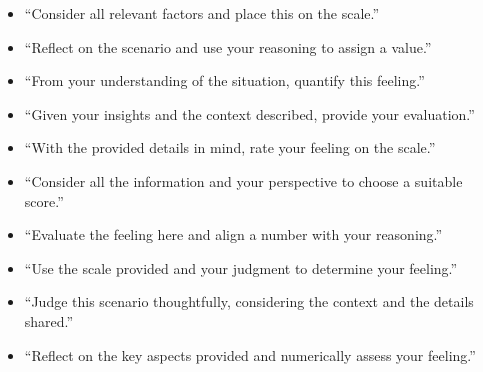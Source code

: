 \begin{itemize}
    \item ``Consider all relevant factors and place this on the scale.''
    \item ``Reflect on the scenario and use your reasoning to assign a value.''
    \item ``From your understanding of the situation, quantify this feeling.''
    \item ``Given your insights and the context described, provide your evaluation.''
    \item ``With the provided details in mind, rate your feeling on the scale.''
    \item ``Consider all the information and your perspective to choose a suitable score.''
    \item ``Evaluate the feeling here and align a number with your reasoning.''
    \item ``Use the scale provided and your judgment to determine your feeling.''
    \item ``Judge this scenario thoughtfully, considering the context and the details shared.''
    \item ``Reflect on the key aspects provided and numerically assess your feeling.''
\end{itemize}

